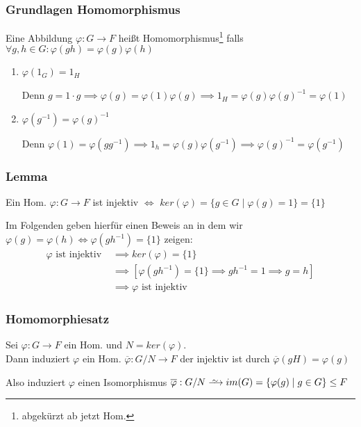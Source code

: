 \documentclass[12pt, german]{article}
\newcommand\iso{\xrightarrow{
		\,\smash{\raisebox{-0.65ex}{\ensuremath{\scriptstyle\sim}}}\,}}
\begin{document}
\subsubsection{Grundlagen Homomorphismus}
	Eine Abbildung $\varphi: G \to F$ heißt Homomorphismus\footnote{abgekürzt ab jetzt Hom.} falls $\forall g,h \in G : \varphi(gh) = \varphi(g)\varphi(h)$ \\
	\begin{enumerate}[label=\roman*)]
		\item $\varphi(1_G) = 1_H$ ~\par
			Denn $g=1\cdot g \implies \varphi(g)=\varphi(1)\varphi(g) \implies 1_H = \varphi(g) \varphi(g)^{-1} = \varphi(1)$
		
		\item $\varphi(g^{-1})=\varphi(g)^{-1}$ ~\par
			Denn $\varphi(1)=\varphi(gg^{-1}) \implies 1_h = \varphi(g)\varphi(g^{-1}) \implies \varphi(g)^{-1} = \varphi(g^{-1})$
	\end{enumerate}

\subsubsection{Lemma}
	Ein Hom. $\varphi: G \to F$ ist injektiv $\iff$ $ker(\varphi) = \{g \in G \mid \varphi(g)= 1\} = \{1\}$ 
	
	Im Folgenden geben hierfür einen Beweis an in dem wir $\varphi(g) = \varphi(h) \iff \varphi(gh^{-1}) = \{1\} $ zeigen:
	\begin{align*}
		\varphi \text{ ist injektiv } &\implies ker(\varphi) = \{1\} \\
		&\implies [\varphi(gh^{-1}) = \{1\} \implies gh^{-1} = 1 \implies g = h] \\ 
		&\implies \varphi \text{ ist injektiv}
	\end{align*}

\subsubsection{Homomorphiesatz}
	Sei $\varphi: G \to F$ ein Hom.  und $N = ker(\varphi)$. \\
	Dann induziert $\varphi$ ein Hom. $\overline{\varphi} : G/N \to F$ der injektiv ist durch $\overline{\varphi}(gH) = \varphi(g)$ 
	\newline
	
	Also induziert $\varphi$ einen Isomorphismus $\overline{\varphi}: G/N \iso im(G) = \{\varphi(g) \mid g \in G\} \leq F$
\end{document}
